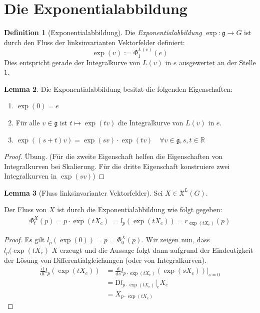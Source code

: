 \documentclass[a4paper]{scrreprt}
\numberwithin{equation}{chapter}
\newcommand{\D}{\mathrm{d}}
\newcommand{\DD}{\mathrm{D}}
\newcommand{\R}{\mathbb{R}}
\newcommand{\vf}{\mathfrak{X}}
\theoremstyle{definition}
\newtheorem{defn}{Definition}[section]
\newtheorem{lemma}[defn]{Lemma}
\begin{document}
	\section{Die Exponentialabbildung}
		\begin{defn}[Exponentialabbildung]
			Die \emph{Exponentialabbildung} $\exp\colon\mathfrak{g}\rightarrow G$ ist durch den Fluss der linksinvarianten Vektorfelder definiert:
			\begin{equation*}
				\exp(v):=\Phi_1^{L(v)}(e)
			\end{equation*}
			Dies entspricht gerade der Integralkurve von $L(v)$ in $e$ ausgewertet an der Stelle $1$.
		\end{defn}
		\begin{lemma}\label{lemma:Eigenschaften_exp}
			Die Exponentialabbildung besitzt die folgenden Eigenschaften:
			\begin{enumerate}[label=\arabic*.]
				\item $\exp(0)=e$
				\item Für alle $v \in \mathfrak g$ ist $t \mapsto \exp(tv)$ die Integralkurve von $L(v)$ in $e$.
				\item $\exp((s+t)v)=\exp(sv)\cdot\exp(tv) \quad\forall v\in\mathfrak{g}, s,t\in \R$
			\end{enumerate}
			\begin{proof}
				Übung. (Für die zweite Eigenschaft helfen die Eigenschaften von Integralkurven bei Skalierung. Für die dritte Eigenschaft konstruiere zwei Integralkurven in $\exp(sv)$)
			\end{proof}
		\end{lemma}
		\begin{lemma}[Fluss linksinvarianter Vektorfelder]\label{lemma:Fluss_linksinvarianter_Vektorfelder}
			Sei $X\in\vf^L(G)$.
			
			Der Fluss von $X$ ist durch die Exponentialabbildung wie folgt gegeben:
			\begin{align*}
				\Phi^X_t(p)=p\cdot \exp(tX_e) \; =l_p(\exp(tX_e))=r_{\exp(tX_e)}(p)
			\end{align*}
			\begin{proof}
				Es gilt $l_p(\exp(0))=p=\Phi^X_0(p)$. Wir zeigen nun, dass $l_p(\exp(tX_e)$ $X$ erzeugt und die Aussage folgt dann aufgrund der Eindeutigkeit der Lösung von Differentialgleichungen (oder von Integralkurven).
				\begin{align*}
					\frac{\D}{\D t} l_p(\exp(tX_e))&=\frac{\D}{\D s} l_{p\cdot\exp(tX_e)}(\exp(sX_e))\Big\vert_{s=0}\\
					&=\DD l_{p\cdot\exp(tX_e)}\vert_eX_e\\
					&=X_{p\cdot\exp(tX_e)}
				\end{align*}
			\end{proof}
		\end{lemma}
\end{document}

